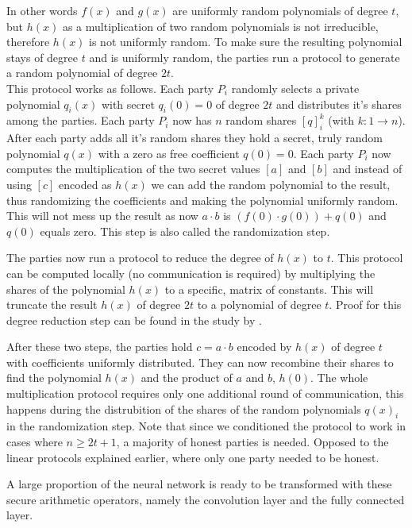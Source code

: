 In other words $f(x)$ and $g(x)$ are uniformly random polynomials of degree $t$, but $h(x)$ as a multiplication of two random polynomials is not irreducible, therefore $h(x)$ is not uniformly random. To make sure the resulting polynomial stays of degree $t$ and is uniformly random, the parties run a protocol to generate a random polynomial of degree $2t$.\\

This protocol works as follows. Each party $P_i$ randomly selects a private polynomial $q_i(x)$ with secret $q_i(0) = 0$ of degree $2t$ and distributes it's shares among the parties. Each party $P_i$ now has $n$ random shares $[q]_i^k$ (with $k: 1 \rightarrow n$). After each party adds all it's random shares they hold a secret, truly random polynomial $q(x)$ with a zero as free coefficient $q(0) = 0$.
Each party $P_i$ now computes the multiplication of the two secret values $[a]$ and $[b]$ and instead of using $[c]$ encoded as $h(x)$ we can add the random polynomial to the result, thus randomizing the coefficients and making the polynomial uniformly random. This will not mess up the result as now $a \cdot b$  is $(f(0) \cdot g(0)) + q(0)$ and $q(0)$ equals zero. This step is also called the randomization step.


The parties now run a protocol to reduce the degree of $h(x)$ to $t$. This protocol can be computed locally (no communication is required) by multiplying the shares of the polynomial $h(x)$ to a specific, matrix of constants. This will truncate the result $h(x)$ of degree $2t$ to a polynomial of degree $t$. Proof for this degree reduction step can be found in the study by \cite{asharov2017full}.


After these two steps, the parties hold $c =a \cdot b$ encoded by $h(x)$ of degree $t$ with coefficients uniformly distributed. They can now recombine their shares to find the polynomial $h(x)$ and the product of $a$ and $b$, $h(0)$. The whole multiplication protocol requires only one additional round of communication, this happens during the distrubition of the shares of the random polynomials $q(x)_i$ in the randomization step. Note that since we conditioned the protocol to work in cases where $n \geq 2t + 1$, a majority of honest parties is needed. Opposed to the linear protocols explained earlier, where only one party needed to be honest.


A large proportion of the neural network is ready to be transformed with these secure arithmetic operators, namely the convolution layer and the fully connected layer.

